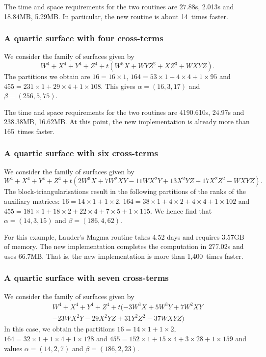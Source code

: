 The time and space requirements for the two routines are 27.88s, 2.013s and 
18.84MB, 5.29MB.  In particular, the new routine is about 14~times faster.

\subsubsection{A quartic surface with four cross-terms}

We consider the family of surfaces given by 
\begin{equation*}
W^4 + X^4 + Y^4 + Z^4 + t (W^3 X + W Y Z^2 + X Z^3 + W X Y Z).
\end{equation*}
The partitions we obtain are $16 = 16 \times 1$, 
$164 = 53 \times 1 + 4 \times 4 + 1 \times 95$ and 
$455 = 231 \times 1 + 29 \times 4 + 1 \times 108$.  This gives 
$\alpha = (16,3,17)$ and $\beta = (256,5,75)$.

The time and space requirements for the two routines are 4190.610s, 24.97s and 
238.38MB, 16.62MB.  At this point, the new implementation is already more 
than 165~times faster.

\subsubsection{A quartic surface with six cross-terms}

We consider the family of surfaces given by
\begin{equation*}
W^4 + X^4 + Y^4 + Z^4 + t (2 W^3 X + 7 W^2 X Y - 11 W X^2 Y + 13 X^2 Y Z + 17 X^2 Z^2 - W X Y Z).
\end{equation*}
The block-triangularisations result in the following partitions of the ranks 
of the auxiliary matrices:  $16 = 14 \times 1 + 1 \times 2$, 
$164 = 38 \times 1 + 4 \times 2 + 4 \times 4 + 1 \times 102$ and 
$455 = 181 \times 1 + 18 \times 2 + 22 \times 4 + 7 \times 5 + 1 \times 115$. 
We hence find that $\alpha = (14,3,15)$ and $\beta = (186,4,62)$.

For this example, Lauder's {\sc Magma} routine takes 4.52 days and requires 
3.57GB of memory.  The new implementation completes the computation in 
277.02s and uses 66.7MB.  That is, the new implementation is more than 
1,400~times faster.

\subsubsection{A quartic surface with seven cross-terms}

We consider the family of surfaces given by
\begin{multline*}
W^4 + X^4 + Y^4 + Z^4 + t (-3 W^3 X + 5 W^3 Y + 7 W^2 X Y \\ 
                           - 23 W X^2 Y - 29 X^2 Y Z + 31 Y^2 Z^2 - 37 W X Y Z)
\end{multline*}
In this case, we obtain the partitions $16 = 14 \times 1 + 1 \times 2$, 
$164 = 32 \times 1 + 1 \times 4 + 1 \times 128$ and 
$455 = 152 \times 1 + 15 \times 4 + 3 \times 28 + 1 \times 159$ and 
values $\alpha = (14,2,7)$ and $\beta = (186,2,23)$.

